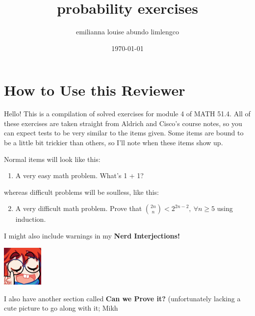\documentclass{article}
\title{probability exercises}
\author{emilianna louise abundo limlengco}
\date{\today}
\begin{document}
 

\section*{How to Use this Reviewer}
Hello! This is a compilation of solved exercises for module 4 of MATH 51.4. All of these exercises are taken straight from Aldrich and Cisco's course notes, so you can expect tests 
to be very similar to the items given. Some items are bound to be a little bit trickier than others, so I'll note when these items show up.\par Normal items will look like this:\begin{enumerate} 
    \item A very easy math problem. What's 1 + 1?
\end{enumerate} 
whereas difficult problems will be soulless, like this:\begin{enumerate}\setcounter{enumi}{1}
    \item A very difficult math problem. Prove that $\displaystyle \binom{2n}{n} < 2^{2n-2},~\forall n \geq 5$ using induction. 
\end{enumerate} I might also include warnings in my \textbf{Nerd Interjections!}\par
\parindent=25pt \begin{minipage}[t]{.14\textwidth}
    \vspace{0pt}
    \includegraphics[width=2cm]{nerd_maddy.png}
\end{minipage}%
\parindent=0pt \par I also have another section called \textbf{Can we Prove it?} (unfortunately lacking a cute picture to go along with it; Mikh 
\end{document}
